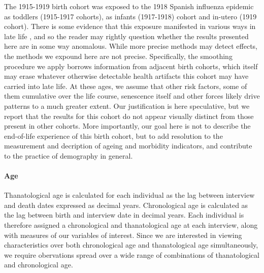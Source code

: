 \documentclass[11pt,oneside,a4paper]{article}
\begin{document}
The 1915-1919 birth cohort was exposed to the 1918 Spanish influenza
epidemic as toddlers (1915-1917 cohorts), as infants (1917-1918) cohort and
in-utero (1919 cohort). There is some evidence that this exposure manifested in
various ways in late life \citep[e.g.,][]{almond20061918}, and so the reader may
rightly question whether the results presented here are in some way anomalous.
While more precise methods may detect effects, the methods we expound here are
not precise. Specifically, the smoothing procedure we apply borrows
information from adjacent birth cohorts, which itself may erase whatever
otherwise detectable health artifacts this cohort may have carried into late
life. At these ages, we assume that other risk factors, some of them cumulative
over the life course, senescence itself and other forces likely drive patterns
to a much greater extent. Our justification is here speculative, but we report
that the results for this cohort do not appear visually distinct from those
present in other cohorts. More importantly, our goal here is not to describe the
end-of-life experience of this birth cohort, but to add resolution to the
measurement and decription of ageing and morbidity indicators, and contribute to
the practice of demography in general.

\paragraph*{Age}
Thanatological age is calculated for each individual as the lag between
interview and death dates expressed as decimal years. Chronological age is
calculated as the lag between birth and interview date in decimal years. Each
individual is therefore assigned a chronological and thanatological age at each
interview, along with measures of our variables of interest. Since
we are interested in viewing characteristics over both chronological age and
thanatological age simultaneously, we require obervations spread over a wide
range of combinations of thanatological and chronological age.
\end{document}

